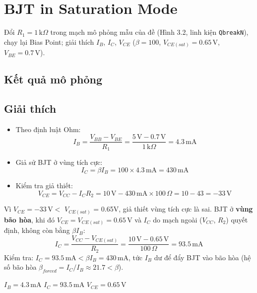 \section{BJT in Saturation Mode}
Đổi $R_1 = 1\,\text{k}\Omega$ trong mạch mô phỏng mẫu của đề (Hình 3.2, linh kiện \texttt{QbreakN}), chạy lại Bias Point; giải thích $I_B$, $I_C$, $V_{CE}$ ($\beta = 100$, $V_{CE(sat)} = 0.65\,\text{V}$, $V_{BE} = 0.7\,\text{V}$).

\subsection{Kết quả mô phỏng}

\subsection{Giải thích}
\begin{itemize}
  \item Theo định luật Ohm:
  \[ I_B = \frac{V_{BB}-V_{BE}}{R_1} = \frac{5\,\text{V} - 0.7\,\text{V}}{1\,\text{k}\Omega} = 4.3\,\text{mA} \]
  \item Giả sử BJT ở vùng tích cực:
  \[ I_C = \beta I_B = 100 \times 4.3\,\text{mA} = 430\,\text{mA} \]
  \item Kiểm tra giả thiết:
  \[ V_{CE} = V_{CC} - I_C R_2 = 10\,\text{V} - 430\,\text{mA}\times 100\,\Omega = 10 - 43 = -33\,\text{V} \]
\end{itemize}
Vì $V_{CE} = -33\,\text{V} < $ $V_{CE(sat)}$ = 0.65V, giả thiết vùng tích cực là sai. BJT ở \textbf{vùng bão hòa}, khi đó $V_{CE} = V_{CE(sat)} = 0.65\,\text{V}$ và $I_C$ do mạch ngoài ($V_{CC}$, $R_2$) quyết định, không còn bằng $\beta I_B$:
\[ I_C = \frac{V_{CC} - V_{CE(sat)}}{R_2} = \frac{10\,\text{V} - 0.65\,\text{V}}{100\,\Omega} = 93.5\,\text{mA} \]
Kiểm tra: $I_C = 93.5\,\text{mA} < \beta I_B = 430\,\text{mA}$, tức $I_B$ dư để đẩy BJT vào bão hòa (hệ số bão hòa $\beta_{forced} = I_C/I_B \approx 21.7 < \beta$).

\begin{dapsobox}
$I_B = 4.3\,\text{mA}$ \qquad $I_C = 93.5\,\text{mA}$ \qquad $V_{CE} = 0.65\,\text{V}$
\end{dapsobox}

